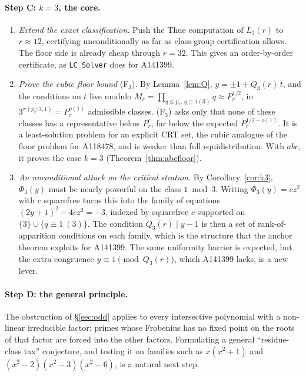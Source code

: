 \documentclass[11pt]{article}
\theoremstyle{definition}
\theoremstyle{remark}
\begin{document}
\paragraph{Step C: $k=3$, the core.}
\begin{enumerate}
\item[C1.] \emph{Extend the exact classification.} Push the Thue computation of
$L_3(r)$ to $r\approx12$, certifying unconditionally as far as class-group
certification allows. The floor side is already cheap through $r=32$. This
gives an order-by-order certificate, as \texttt{LC\_Solver} does for A141399.
\item[C2.] \emph{Prove the cubic floor bound} (F$_3$). By Lemma~\ref{lem:Q},
$y=\pm1+Q_3(r)\,t$, and the conditions on $t$ live modulo
$M_r=\prod_{q\le p_r,\,q\equiv1(3)}q\approx P_r^{1/2}$, in $3^{\pi(p_r;3,1)}=P_r^{o(1)}$
admissible classes. (F$_3$) asks only that none of these classes has a
representative below $P_r^{c}$, far below the expected $P_r^{1/2-o(1)}$. It is a
least-solution problem for an explicit CRT set, the cubic analogue of the floor
problem for A118478, and is weaker than full equidistribution. With $abc$, it
proves the case $k=3$ (Theorem~\ref{thm:abcfloor}).
\item[C3.] \emph{An unconditional attack on the critical stratum.} By
Corollary~\ref{cor:k3}, $\Phi_3(y)$ must be nearly powerful on the class
$1\bmod3$. Writing $\Phi_3(y)=cz^2$ with $c$ squarefree turns this into the
family of equations $(2y+1)^2-4cz^2=-3$, indexed by squarefree $c$ supported on
$\{3\}\cup\{q\equiv1\ (3)\}$. The condition $Q_3(r)\mid y-1$ is then a set of
rank-of-apparition conditions on each family, which is the structure that the
anchor theorem exploits for A141399. The same uniformity barrier is expected, but
the extra congruence $y\equiv1\pmod{Q_3(r)}$, which A141399 lacks, is a new lever.
\end{enumerate}

\paragraph{Step D: the general principle.} The obstruction of
\S\ref{sec:odd} applies to every intersective polynomial with a non-linear
irreducible factor: primes whose Frobenius has no fixed point on the roots of
that factor are forced into the other factors. Formulating a general
``residue-class tax'' conjecture, and testing it on families such as
$x(x^2+1)$ and $(x^2-2)(x^2-3)(x^2-6)$, is a natural next step.
\end{document}
